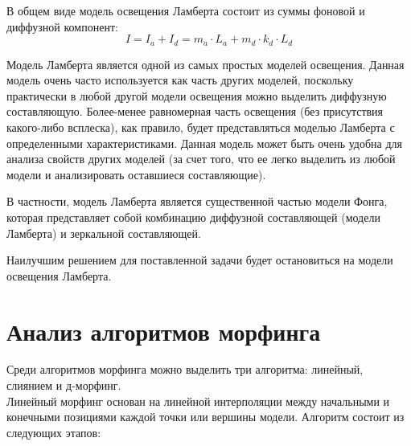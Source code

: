 \leavevmode

В общем виде модель освещения Ламберта состоит из суммы фоновой и диффузной компонент:
\begin{equation}
	I = I_{a} + I_{d} = m_{a} \cdot L_{a} + m_{d} \cdot k_{d} \cdot L_{d}
\end{equation}

Модель Ламберта является одной из самых простых моделей освещения. Данная модель очень часто используется как часть других моделей, поскольку практически в любой другой модели освещения можно выделить диффузную составляющую. Более-менее равномерная часть освещения (без присутствия какого-либо всплеска), как правило, будет представляться моделью Ламберта с определенными характеристиками. Данная модель может быть очень удобна для анализа свойств других моделей (за счет того, что ее легко выделить из любой модели и анализировать оставшиеся составляющие).

В частности, модель Ламберта является существенной частью модели Фонга, которая представляет собой комбинацию диффузной составляющей (модели Ламберта) и зеркальной составляющей. \cite{Zadorozhnyi}

\leavevmode

Наилучшим решением для поставленной задачи будет остановиться на модели освещения Ламберта.

\newpage

\section{Анализ алгоритмов морфинга}

Среди алгоритмов морфинга можно выделить три алгоритма: линейный, слиянием и д-морфинг.\\

Линейный морфинг основан на линейной интерполяции между начальными и конечными позициями каждой точки или вершины модели. Алгоритм состоит из следующих этапов:


